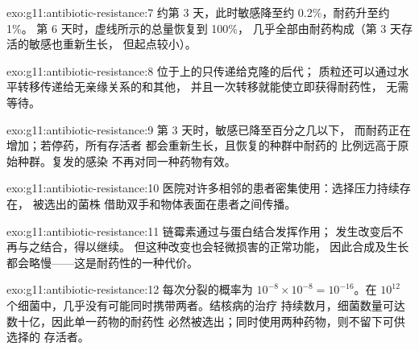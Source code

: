 \begin{solution}{exo:g11:antibiotic-resistance:7}
约第 3 天，此时敏感降至约 0.2\%，耐药升至约 1\%。
第 6 天时，虚线所示的总量恢复到 100\%，
几乎全部由耐药构成（第 3 天存活的敏感也重新生长，
但起点较小）。
\end{solution}

\begin{solution}{exo:g11:antibiotic-resistance:8}
位于上的只传递给克隆的后代；
质粒还可以通过水平转移传递给无亲缘关系的和其他，
并且一次转移就能使立即获得耐药性，
无需等待。
\end{solution}

\begin{solution}{exo:g11:antibiotic-resistance:9}
第 3 天时，敏感已降至百分之几以下，
而耐药正在增加；若停药，所有存活者
都会重新生长，且恢复的种群中耐药的
比例远高于原始种群。复发的感染
不再对同一种药物有效。
\end{solution}

\begin{solution}{exo:g11:antibiotic-resistance:10}
医院对许多相邻的患者密集使用：选择压力持续存在，
被选出的菌株
借助双手和物体表面在患者之间传播。
\end{solution}

\begin{solution}{exo:g11:antibiotic-resistance:11}
链霉素通过与蛋白结合发挥作用；
发生改变后不再与之结合，得以继续。
但这种改变也会轻微损害的正常功能，
因此合成及生长都会略慢——这是耐药性的一种代价。
\end{solution}

\begin{solution}{exo:g11:antibiotic-resistance:12}
每次分裂的概率为 $10^{-8} \times 10^{-8} = 10^{-16}$。在 $10^{12}$
个细菌中，几乎没有可能同时携带两者。结核病的治疗
持续数月，细菌数量可达数十亿，因此单一药物的耐药性
必然被选出；同时使用两种药物，则不留下可供选择的
存活者。
\end{solution}

